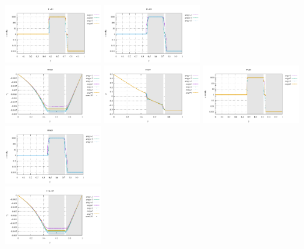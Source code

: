 \begin{center}
\includegraphics[width=4.25cm]{python_codes/fieldstone_41/results/exp3/81x81/profile_eta_elemental.pdf}
\includegraphics[width=4.25cm]{python_codes/fieldstone_41/results/exp3/81x81/profile_eta_nodal.pdf}\\
\includegraphics[width=4.25cm]{python_codes/fieldstone_41/results/exp3/97x97/profile_v.pdf}
\includegraphics[width=4.25cm]{python_codes/fieldstone_41/results/exp3/97x97/profile_p.pdf}
\includegraphics[width=4.25cm]{python_codes/fieldstone_41/results/exp3/97x97/profile_eta_elemental.pdf}
\includegraphics[width=4.25cm]{python_codes/fieldstone_41/results/exp3/97x97/profile_eta_nodal.pdf}\\
\includegraphics[width=4.25cm]{python_codes/fieldstone_41/results/exp3/113x113/profile_v.pdf}

\end{center}
